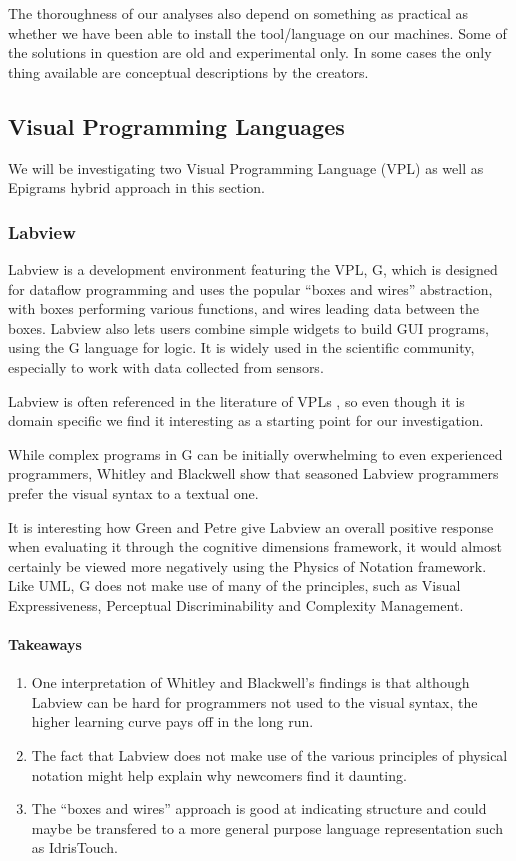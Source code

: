 The thoroughness of our analyses also depend on something as practical as whether we have been able to install the tool/language on our machines. Some of the solutions in question are old and experimental only. In some cases the only thing available are conceptual descriptions by the creators.

\subsection{Visual Programming Languages}
We will be investigating two Visual Programming Language (VPL) as well as Epigrams hybrid approach in this section.

\subsubsection{Labview}

Labview is a development environment featuring the VPL, G, which is designed for dataflow programming and uses the popular ``boxes and wires'' abstraction, with boxes performing various functions, and wires leading data between the boxes. Labview also lets users combine simple widgets to build GUI programs, using the G language for logic. It is widely used in the scientific community, especially to work with data collected from sensors.

Labview is often referenced in the literature of VPLs , so even though it is domain specific we find it interesting as a starting point for our investigation.

While complex programs in G can be initially overwhelming to even experienced programmers, Whitley and Blackwell  show that seasoned Labview programmers prefer the visual syntax to a textual one.

It is interesting how Green and Petre  give Labview an overall positive response when evaluating it through the cognitive dimensions framework, it would almost certainly be viewed more negatively using the Physics of Notation framework. Like UML, G does not make use of many of the principles, such as Visual Expressiveness, Perceptual Discriminability and Complexity Management.

\paragraph{Takeaways}
\begin{enumerate}
	\item One interpretation of Whitley and Blackwell's findings  is that although Labview can be hard for programmers not used to the visual syntax, the higher learning curve pays off in the long run.
	\item The fact that Labview does not make use of the various principles of physical notation might help explain why newcomers find it daunting.
	\item The ``boxes and wires'' approach is good at indicating structure and could maybe be transfered to a more general purpose language representation such as IdrisTouch.
\end{enumerate}



